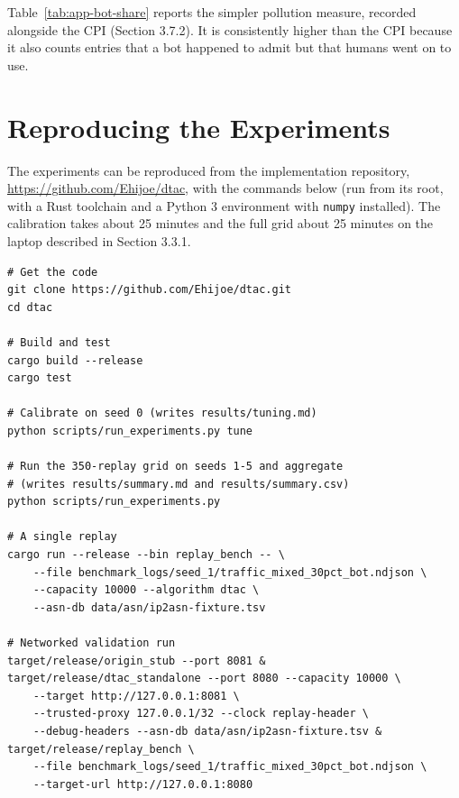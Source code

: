 Table~\ref{tab:app-bot-share} reports the simpler pollution measure, recorded alongside the CPI (Section 3.7.2). It is consistently higher than the CPI because it also counts entries that a bot happened to admit but that humans went on to use.

\section{Reproducing the Experiments}
The experiments can be reproduced from the implementation repository, \url{https://github.com/Ehijoe/dtac}, with the commands below (run from its root, with a Rust toolchain and a Python 3 environment with \texttt{numpy} installed). The calibration takes about 25 minutes and the full grid about 25 minutes on the laptop described in Section 3.3.1.

\begin{verbatim}
# Get the code
git clone https://github.com/Ehijoe/dtac.git
cd dtac

# Build and test
cargo build --release
cargo test

# Calibrate on seed 0 (writes results/tuning.md)
python scripts/run_experiments.py tune

# Run the 350-replay grid on seeds 1-5 and aggregate
# (writes results/summary.md and results/summary.csv)
python scripts/run_experiments.py

# A single replay
cargo run --release --bin replay_bench -- \
    --file benchmark_logs/seed_1/traffic_mixed_30pct_bot.ndjson \
    --capacity 10000 --algorithm dtac \
    --asn-db data/asn/ip2asn-fixture.tsv

# Networked validation run
target/release/origin_stub --port 8081 &
target/release/dtac_standalone --port 8080 --capacity 10000 \
    --target http://127.0.0.1:8081 \
    --trusted-proxy 127.0.0.1/32 --clock replay-header \
    --debug-headers --asn-db data/asn/ip2asn-fixture.tsv &
target/release/replay_bench \
    --file benchmark_logs/seed_1/traffic_mixed_30pct_bot.ndjson \
    --target-url http://127.0.0.1:8080
\end{verbatim}

